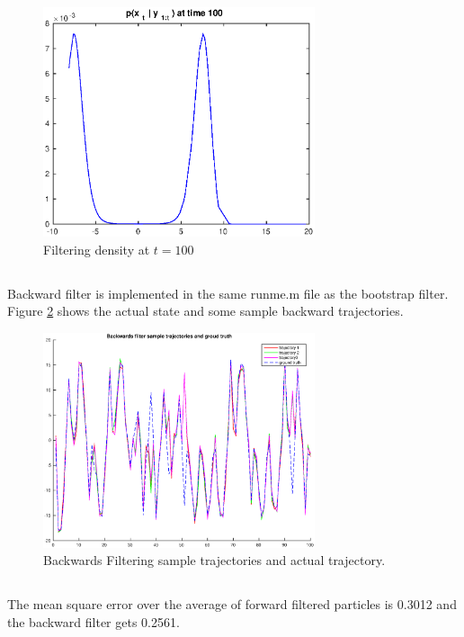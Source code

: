 \documentclass[11pt, english]{article}
\begin{document}
\begin{figure}[h]
  
  \centering
    \includegraphics[width=80mm]{./figs/017_15_t100N1000.eps}
    \caption{Filtering density at $t=100$}
    \label{n10004}
\end{figure}

\subsection{}

Backward filter is implemented in the same runme.m file as the bootstrap filter. Figure \ref{bk} shows the actual state and some sample backward trajectories.

\begin{figure}[h]
  
  \centering
    \includegraphics[width=80mm]{./figs/018_16bksam.eps}
    \caption{Backwards Filtering sample trajectories and actual trajectory.}
    \label{bk}
\end{figure}

\subsection{}

The mean square error over the average of forward filtered particles is 0.3012 and the backward filter gets 0.2561.
\end{document}
